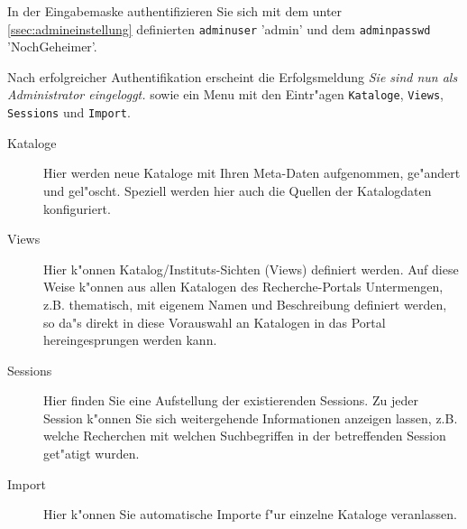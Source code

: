\documentclass[11pt, twoside, a4paper, BCOR8mm, DIV12, bibtotoc,idxtotoc]{scrbook}
\begin{document}
In der Eingabemaske authentifizieren Sie sich mit dem unter
\ref{ssec:admineinstellung} definierten \texttt{adminuser} 'admin' und
dem \texttt{adminpasswd} 'NochGeheimer'.

Nach erfolgreicher Authentifikation erscheint die Erfolgsmeldung
\emph{Sie sind nun als Administrator eingeloggt.} sowie ein Menu mit
den Eintr"agen \texttt{Kataloge}, \texttt{Views},
\texttt{Sessions} und \texttt{Import}.

\begin{description}
\item[Kataloge] Hier werden neue Kataloge mit Ihren Meta-Daten
  aufgenommen, ge"andert und gel"oscht. Speziell werden hier auch die
  Quellen der Katalogdaten konfiguriert.
\item[Views] Hier k"onnen Katalog/Instituts-Sichten (Views) definiert
  werden. Auf diese Weise k"onnen aus allen Katalogen des
  Recherche-Portals Untermengen, z.B. thematisch, mit eigenem Namen
  und Beschreibung definiert werden, so da"s direkt in diese
  Vorauswahl an Katalogen in das Portal hereingesprungen werden kann.
\item[Sessions] Hier finden Sie eine Aufstellung der existierenden
  Sessions. Zu jeder Session k"onnen Sie sich weitergehende
  Informationen anzeigen lassen, z.B. welche Recherchen mit welchen
  Suchbegriffen in der betreffenden Session get"atigt wurden.
\item[Import] Hier k"onnen Sie automatische Importe f"ur einzelne
  Kataloge veranlassen.
\end{description}
\end{document}

